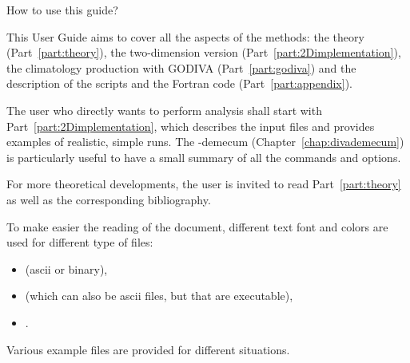 \begin{center}
\begin{minipage}[c]{.85\textwidth}
\end{minipage}

\end{center}

\vspace*{\fill}

\newpage

\vspace*{\fill}

\begin{center}
\begin{minipage}[c]{.85\textwidth}
\Large{How to use this guide?}
\vspace{1cm}
\normalsize

This \diva User Guide aims to cover all the aspects of the methods: the theory (Part~\ref{part:theory}), the two-dimension version (Part~\ref{part:2Dimplementation}), the climatology production with GODIVA (Part~\ref{part:godiva}) and the description of the scripts and the Fortran code (Part~\ref{part:appendix}). 

The user who directly wants to perform analysis shall start with Part~\ref{part:2Dimplementation}, which describes the input files and provides examples of realistic, simple runs. The \diva-demecum (Chapter~\ref{chap:divademecum}) is particularly useful to have a small summary of all the commands and options.

For more theoretical developments, the user is invited to read Part~\ref{part:theory} as well as the corresponding bibliography.

To make easier the reading of the document, different text font and colors are used for different type of files:
\begin{itemize}
\item {} (ascii or binary),
\item {} (which can also be ascii files, but that are executable),
\item {}.
\end{itemize}
Various example files are provided for different situations. 


\vspace{.25cm}
\end{minipage}

\end{center}

\vspace*{\fill}

